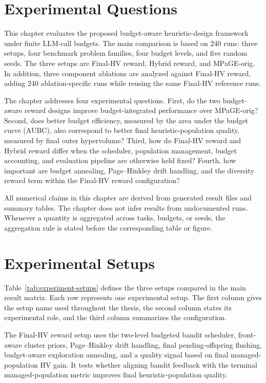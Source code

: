 \documentclass[../main.tex]{subfiles}
\begin{document}
\section{Experimental Questions}

This chapter evaluates the proposed budget-aware heuristic-design framework under finite LLM-call budgets. The main comparison is based on 240 runs: three setups, four benchmark problem families, four budget levels, and five random seeds. The three setups are Final-HV reward, Hybrid reward, and MPaGE-orig. In addition, three component ablations are analyzed against Final-HV reward, adding 240 ablation-specific runs while reusing the same Final-HV reference runs.

The chapter addresses four experimental questions. First, do the two budget-aware reward designs improve budget-integrated performance over MPaGE-orig? Second, does better budget efficiency, measured by the area under the budget curve (AUBC), also correspond to better final heuristic-population quality, measured by final outer hypervolume? Third, how do Final-HV reward and Hybrid reward differ when the scheduler, population management, budget accounting, and evaluation pipeline are otherwise held fixed? Fourth, how important are budget annealing, Page--Hinkley drift handling, and the diversity reward term within the Final-HV reward configuration?

All numerical claims in this chapter are derived from generated result files and summary tables. The chapter does not infer results from undocumented runs. Whenever a quantity is aggregated across tasks, budgets, or seeds, the aggregation rule is stated before the corresponding table or figure.

\section{Experimental Setups}

Table~\ref{tab:experiment-setups} defines the three setups compared in the main result matrix. Each row represents one experimental setup. The first column gives the setup name used throughout the thesis, the second column states its experimental role, and the third column summarizes the configuration.



The Final-HV reward setup uses the two-level budgeted bandit scheduler, front-aware cluster priors, Page--Hinkley drift handling, final pending-offspring flushing, budget-aware exploration annealing, and a quality signal based on final managed-population HV gain. It tests whether aligning bandit feedback with the terminal managed-population metric improves final heuristic-population quality.
\end{document}

